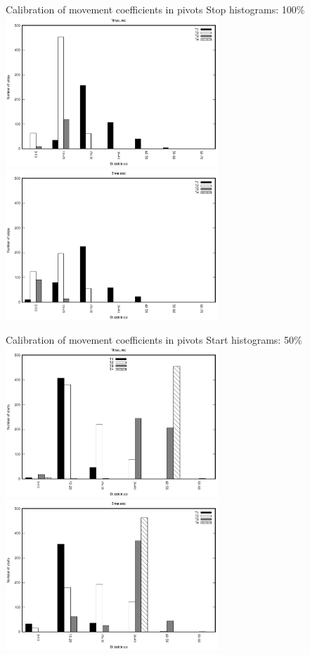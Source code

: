 \documentclass[10pt]{beamer}
\begin{document}
\begin{frame}{Calibration of movement coefficients in pivots}
{Stop histograms: 100\%}
	\includegraphics[width=0.60\textwidth]{pivot-measured-stops-100.eps}\\
	\includegraphics[width=0.60\textwidth]{pivot-simulated-stops-100.eps}
\end{frame}

\begin{frame}{Calibration of movement coefficients in pivots}
{Start histograms: 50\%}
	\includegraphics[width=0.60\textwidth]{pivot-measured-starts-50.eps}\\
	\includegraphics[width=0.60\textwidth]{pivot-simulated-starts-50.eps}
\end{frame}
\end{document}
